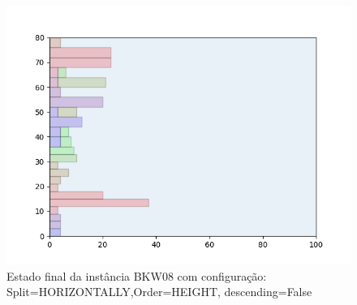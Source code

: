 \begin{figure}[H]
    \centering
    \caption[]{Estado final da instância BKW08 com configuração: Split=HORIZONTALLY,Order=HEIGHT, descending=False}
    \label{fig:bkw08-horizontally-height-false}
    \includegraphics[scale=0.5]{output/figures/bkw/bkw08/horizontally/height/false/00}
\end{figure}